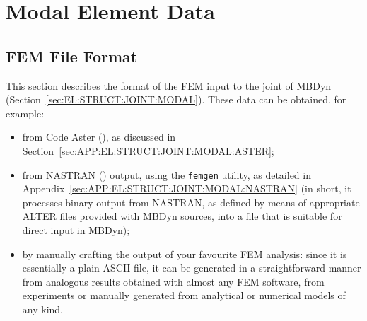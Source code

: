 %
%
%
%
%
% 
%
%

\chapter{Modal Element Data}

\section{FEM File Format}
\label{sec:APP:EL:STRUCT:JOINT:MODAL:FORMAT}

This section describes the format of the FEM input to the 
joint of MBDyn (Section~\ref{sec:EL:STRUCT:JOINT:MODAL}).
These data can be obtained, for example:
\begin{itemize}
\item from Code Aster
(),
as discussed in Section~\ref{sec:APP:EL:STRUCT:JOINT:MODAL:ASTER};
\item from NASTRAN
()
output, using the \texttt{femgen} utility,
as detailed in Appendix~\ref{sec:APP:EL:STRUCT:JOINT:MODAL:NASTRAN}
(in short, it processes binary output from NASTRAN, as defined by means
of appropriate ALTER files provided with MBDyn sources, into a file
that is suitable for direct input in MBDyn);
\item by manually crafting the output of your favourite FEM analysis:
since it is essentially a plain ASCII file, it can be generated
in a straightforward manner from analogous results obtained with
almost any FEM software, from experiments or manually generated
from analytical or numerical models of any kind.
\end{itemize}

